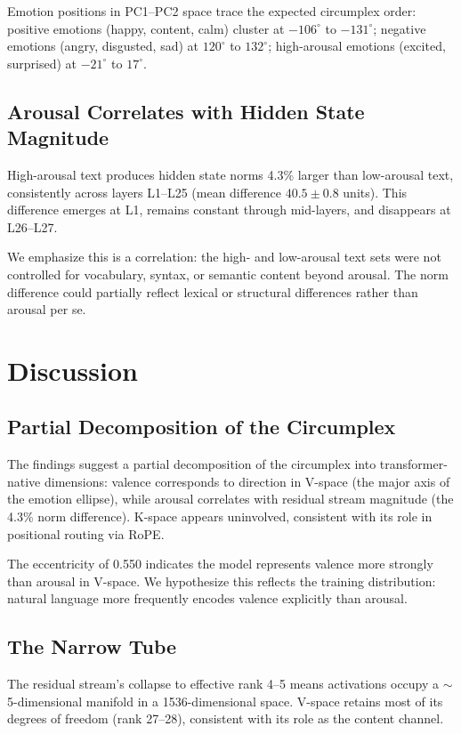 \documentclass[11pt,a4paper]{article}
\begin{document}
Emotion positions in PC1--PC2 space trace the expected circumplex order: positive emotions (happy, content, calm) cluster at $-106^\circ$ to $-131^\circ$; negative emotions (angry, disgusted, sad) at $120^\circ$ to $132^\circ$; high-arousal emotions (excited, surprised) at $-21^\circ$ to $17^\circ$.

\subsection{Arousal Correlates with Hidden State Magnitude}

High-arousal text produces hidden state norms 4.3\% larger than low-arousal text, consistently across layers L1--L25 (mean difference $40.5 \pm 0.8$ units). This difference emerges at L1, remains constant through mid-layers, and disappears at L26--L27.

We emphasize this is a correlation: the high- and low-arousal text sets were not controlled for vocabulary, syntax, or semantic content beyond arousal. The norm difference could partially reflect lexical or structural differences rather than arousal per se.

\section{Discussion}

\subsection{Partial Decomposition of the Circumplex}

The findings suggest a partial decomposition of the circumplex into transformer-native dimensions: valence corresponds to direction in V-space (the major axis of the emotion ellipse), while arousal correlates with residual stream magnitude (the 4.3\% norm difference). K-space appears uninvolved, consistent with its role in positional routing via RoPE.

The eccentricity of 0.550 indicates the model represents valence more strongly than arousal in V-space. We hypothesize this reflects the training distribution: natural language more frequently encodes valence explicitly than arousal.

\subsection{The Narrow Tube}

The residual stream's collapse to effective rank 4--5 means activations occupy a $\sim$5-dimensional manifold in a 1536-dimensional space. V-space retains most of its degrees of freedom (rank 27--28), consistent with its role as the content channel.
\end{document}
